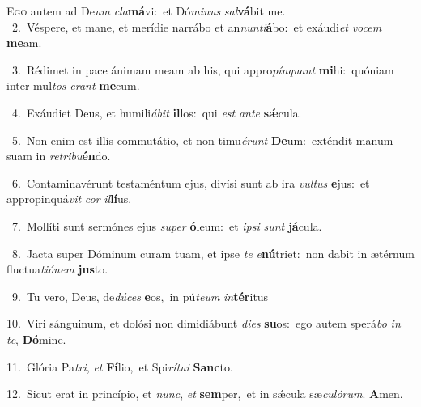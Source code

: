 \lettrine{\initial\textcolor{\initialcolor}{E}}{go} autem ad De\textit{um} \textit{cla}\-\textbf{má}vi:~\star et Dó\-\textit{mi}\-\textit{nus} \textit{sal}\-\textbf{vá}bit me.\\
{\numbfont\textcolor{\numbcolor}{~2.}}~Véspere, et mane, et merídie narrábo et an\-\textit{nun}\-\textit{ti}\textbf{á}bo:~\star et exáudi\textit{et} \textit{vo}\-\textit{cem} \textbf{me}\-am.\par
{\numbfont\textcolor{\numbcolor}{~3.}}~Rédimet in pace ánimam meam ab his, qui appro\-\textit{pín}\-\textit{quant} \textbf{mi}\-hi:~\star quóniam inter mul\textit{tos} \textit{e}\-\textit{rant} \textbf{me}\-cum.\par
{\numbfont\textcolor{\numbcolor}{~4.}}~Exáudiet Deus, et humili\-\textit{á}\-\textit{bit} \textbf{il}\-los:~\star qui \textit{est} \textit{an}\-\textit{te} \textbf{sǽ}\-cula.\par
{\numbfont\textcolor{\numbcolor}{~5.}}~Non enim est illis commutátio, et non timu\-\textit{é}\-\textit{runt} \textbf{De}\-um:~\star exténdit manum suam in \textit{re}\-\textit{tri}\textit{bu}\textbf{én}do.\par
{\numbfont\textcolor{\numbcolor}{~6.}}~Contaminavérunt testaméntum ejus, divísi sunt ab ira \textit{vul}\-\textit{tus} \textbf{e}\-jus:~\star et appropinquá\textit{vit} \textit{cor} \textit{il}\-\textbf{lí}us.\par
{\numbfont\textcolor{\numbcolor}{~7.}}~Mollíti sunt sermónes ejus \textit{su}\-\textit{per} \textbf{ó}\-leum:~\star et \textit{ip}\-\textit{si} \textit{sunt} \textbf{já}\-cula.\par
{\numbfont\textcolor{\numbcolor}{~8.}}~Jacta super Dóminum curam tuam, et ipse \textit{te} \textit{e}\-\textbf{nú}triet:~\star non dabit in ætérnum fluctua\-\textit{ti}\-\textit{ó}\textit{nem} \textbf{jus}\-to.\par
{\numbfont\textcolor{\numbcolor}{~9.}}~Tu vero, Deus, de\-\textit{dú}\-\textit{ces} \textbf{e}\-os,~\star in pú\-\textit{te}\-\textit{um} \textit{in}\-\textbf{tér}itus\par
{\numbfont\textcolor{\numbcolor}{10.}}~Viri sánguinum, et dolósi non dimidiábunt \textit{di}\-\textit{es} \textbf{su}\-os:~\star ego autem sperá\textit{bo} \textit{in} \textit{te}\-, \textbf{Dó}\-mine.\par
{\numbfont\textcolor{\numbcolor}{11.}}~Glória Pa\-\textit{tri}\-, \textit{et} \textbf{Fí}\-lio,~\star et Spi\-\textit{rí}\-\textit{tu}\textit{i} \textbf{Sanc}\-to.\par
{\numbfont\textcolor{\numbcolor}{12.}}~Sicut erat in princípio, et \textit{nunc}\-, \textit{et} \textbf{sem}\-per,~\star et in sǽcula sæ\-\textit{cu}\-\textit{ló}\textit{rum}. \textbf{A}\-men.\par
